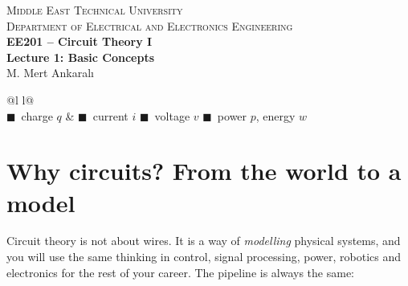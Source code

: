 \documentclass[11pt,a4paper]{article}
\newcommand{\Icol}[1]{\textcolor{ccur}{#1}}
\newcommand{\Vcol}[1]{\textcolor{cvolt}{#1}}
\newcommand{\Pcol}[1]{\textcolor{cpow}{#1}}
\newcommand{\Qcol}[1]{\textcolor{ccharge}{#1}}
\begin{document}
\begin{center}
\begin{tcolorbox}[enhanced, colback=metured!5, colframe=metured, boxrule=1pt,
                  arc=3pt, left=10pt,right=10pt,top=7pt,bottom=7pt, width=\textwidth]
\begin{center}
  {\small\scshape Middle East Technical University}\\[2pt]
  {\small\scshape Department of Electrical and Electronics Engineering}\\[7pt]
  {\Large\bfseries\color{metured} EE201 -- Circuit Theory I}\\[4pt]
  {\large\bfseries Lecture 1: Basic Concepts}\\[6pt]
  {\small M. Mert Ankaralı}
\end{center}
\end{tcolorbox}
\end{center}

\vspace{-0.5em}

\begin{center}
\small
\begin{tabular}{@{}l l@{}}
\toprule
{}\\
\midrule
\Qcol{$\blacksquare$}~charge $q$ & \Icol{$\blacksquare$}~current $i$ \quad
\Vcol{$\blacksquare$}~voltage $v$ \quad \Pcol{$\blacksquare$}~power $p$, energy $w$\\
\bottomrule
\end{tabular}
\end{center}

\section{Why circuits? From the world to a model}

Circuit theory is not about wires. It is a way of \emph{modelling} physical systems, and
you will use the same thinking in control, signal processing, power, robotics and
electronics for the rest of your career. The pipeline is always the same:
\end{document}

